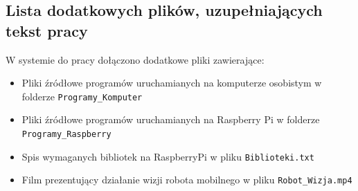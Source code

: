 \documentclass[a4paper,twoside,12pt]{book}
\begin{document}
\begin{appendices}



\chapter{Lista dodatkowych plików, uzupełniających tekst pracy} 


W systemie do pracy dołączono dodatkowe pliki zawierające:
\begin{itemize}
    \item Pliki źródłowe programów uruchamianych na komputerze osobistym w folderze \texttt{Programy\_Komputer}
    \item Pliki źródłowe programów uruchamianych na Raspberry Pi w folderze \texttt{Programy\_Raspberry}
    \item Spis wymaganych bibliotek na RaspberryPi w pliku \texttt{Biblioteki.txt} 
    \item Film prezentujący działanie wizji robota mobilnego w pliku \texttt{Robot\_Wizja.mp4}
\end{itemize}


\listoffigures
{}
\listoftables
{}

\end{appendices}
\end{document}
